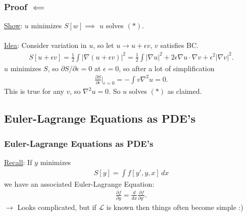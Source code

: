 \documentclass{beamer}
\theoremstyle{definition}
\newcommand{\p}{\partial}
\newcommand{\lag}{\mathcal{L}}
\begin{document}
\begin{frame}
\frametitle{Proof $\impliedby$}
\underline{Show}: $u$ minimizes $S[w] \implies $ $u$ solves $(\ast)$.\\$\,$\\
\pause
\underline{Idea}: Consider variation in $u$, so let $u \to u + \epsilon v$, $v$ satisfies BC. 
\pause
\begin{align*}
S[u + \epsilon v] = \frac{1}{2}\int \vert \nabla (u + \epsilon v) \vert^2 = \frac{1}{2}\int \vert \nabla u\vert^2 + 2\epsilon \nabla u\cdot \nabla v + \epsilon^2 \vert \nabla  v \vert^2 .
\end{align*}
\pause
$u$ minimizes $S$, so $\p S/\p\epsilon = 0$ at $\epsilon =0 $, so after a lot of simplification
\begin{align*}
\frac{\p S}{\p \epsilon}\bigg\vert_{\epsilon=0} = -\int v\nabla^2u = 0.
\end{align*}
\pause
This is true for any $v$, so $\boxed{\nabla^2 u = 0}$. So $u$ solves $(\ast)$ as claimed.  
\end{frame}


\subsection{Euler-Lagrange Equations as PDE's}
\begin{frame}
\frametitle{Euler-Lagrange Equations as PDE's}
\underline{Recall}: If $y$ minimizes
\begin{align*}
S[y] = \int f[y',y,x]\,dx
\end{align*}
\pause
we have an associated Euler-Lagrange Equation:
\begin{align*}
\frac{\p f}{\p y} = \frac{d}{dx}\frac{\p f}{\p y'}.
\end{align*}
\pause
$\longrightarrow$ Looks complicated, but if $\lag$ is known then things often become simple :)



\end{frame}

\end{document}
